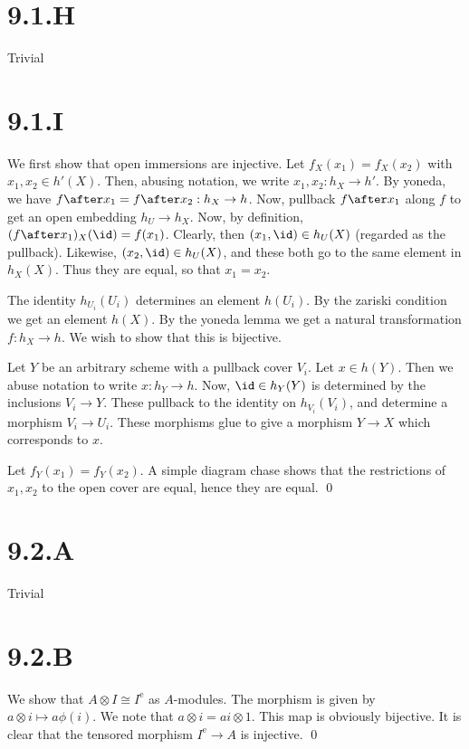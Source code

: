 \documentclass{article}
\begin{document}
\section{9.1.H}
Trivial

\section{9.1.I}
We first show that open immersions are injective. Let $f_X(x_1)=f_X(x_2)$
with $x_1, x_2 \in h'(X)$. Then, abusing notation, we write
$x_1, x_2: h_X \to h'$. By yoneda, we have $f\after x_1=f\after x_2: h_X \to h$. Now,
pullback $f\after x_1$ along $f$ to get an open
embedding $h_U \to h_X$. Now, by definition, $(f \after x_1)_X(\id)=f(x_1)$.
Clearly, then $(x_1,\id) \in h_U(X)$ (regarded as the pullback). Likewise,
$(x_2, \id) \in h_U(X)$, and these both go to the same element in
$h_X(X)$. Thus they are equal, so that $x_1 = x_2$.

The identity $h_{U_i}(U_i)$ determines an element
$h(U_i)$. By the zariski condition we get an element
$h(X)$. By the yoneda lemma we get a natural transformation
$f: h_X \to h$. We wish to show that this is bijective.

Let $Y$ be an arbitrary scheme with a pullback cover
$V_i$. Let $x \in h(Y)$. Then we abuse notation to
write $x: h_Y \to h$. Now, $\id \in h_Y(Y)$ is determined by
the inclusions $V_i \to Y$. These pullback to the identity on
$h_{V_i}(V_i)$, and determine a morphism $V_i \to U_i$.
These morphisms glue to give a morphism $Y \to X$ which
corresponds to $x$.

Let $f_Y(x_1)=f_Y(x_2)$. A simple diagram chase shows that the restrictions
of $x_1, x_2$ to the open cover are equal, hence they are equal.
\qed

\section{9.2.A}
Trivial

\section{9.2.B}
We show that $A \otimes I \cong I^{\text{e}}$ as $A$-modules. The
morphism is given by $a \otimes i \mapsto a\phi(i)$. We note that
$a \otimes i = ai \otimes 1$. This map is obviously bijective. It is clear that the
tensored morphism $I^{\text{e}} \to A$ is injective. \qed
\end{document}
